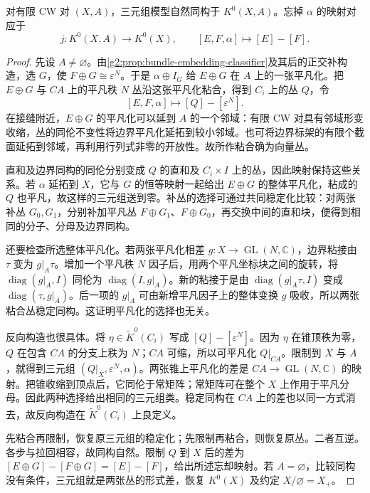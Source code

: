 \begin{proposition}\label{g2:prop:k-triple-model}
	对有限 CW 对 \((X,A)\)，三元组模型自然同构于 \(K^0(X,A)\)。忘掉 \(\alpha\) 的映射对应于
	\[
		j:K^0(X,A)\longrightarrow K^0(X),\qquad
		[E,F,\alpha]\longmapsto[E]-[F].
	\]
\end{proposition}
\begin{proof}
	先设 \(A\ne\varnothing\)。由\cref{g2:prop:bundle-embedding-classifier}及其后的正交补构造，选 \(G\)，使 \(F\oplus G\cong\varepsilon^N\)。于是 \(\alpha\oplus I_G\) 给 \(E\oplus G\) 在 \(A\) 上的一张平凡化。把 \(E\oplus G\) 与 \(CA\) 上的平凡秩 \(N\) 丛沿这张平凡化粘合，得到 \(C_i\) 上的丛 \(Q\)，令
	\[
		[E,F,\alpha]\longmapsto[Q]-[\varepsilon^N].
	\]
	在接缝附近，\(E\oplus G\) 的平凡化可以延到 \(A\) 的一个邻域：有限 CW 对具有邻域形变收缩，丛的同伦不变性将边界平凡化延拓到较小邻域。也可将边界标架的有限个截面延拓到邻域，再利用行列式非零的开放性。故所作粘合确为向量丛。

	直和及边界同构的同伦分别变成 \(Q\) 的直和及 \(C_i\times I\) 上的丛，因此映射保持这些关系。若 \(\alpha\) 延拓到 \(X\)，它与 \(G\) 的恒等映射一起给出 \(E\oplus G\) 的整体平凡化，粘成的 \(Q\) 也平凡，故这样的三元组送到零。补丛的选择可通过共同稳定化比较：对两张补丛 \(G_0,G_1\)，分别补加平凡丛 \(F\oplus G_1\)、\(F\oplus G_0\)，再交换中间的直和块，便得到相同的分子、分母及边界同构。

	还要检查所选整体平凡化。若两张平凡化相差 \(g:X\to\operatorname{GL}(N,\mathbb C)\)，边界粘接由 \(\tau\) 变为 \(g|_A\tau\)。增加一个平凡秩 \(N\) 因子后，用两个平凡坐标块之间的旋转，将 \(\operatorname{diag}(g|_A,I)\) 同伦为 \(\operatorname{diag}(I,g|_A)\)。新的粘接于是由 \(\operatorname{diag}(g|_A\tau,I)\) 变成 \(\operatorname{diag}(\tau,g|_A)\)。后一项的 \(g|_A\) 可由新增平凡因子上的整体变换 \(g\) 吸收，所以两张粘合丛稳定同构。这证明平凡化的选择也无关。

	反向构造也很具体。将 \(\eta\in\widetilde K^0(C_i)\) 写成 \([Q]-[\varepsilon^N]\)。因为 \(\eta\) 在锥顶秩为零，\(Q\) 在包含 \(CA\) 的分支上秩为 \(N\)；\(CA\) 可缩，所以可平凡化 \(Q|_{CA}\)。限制到 \(X\) 与 \(A\)，就得到三元组 \((Q|_X,\varepsilon^N,\alpha)\)。两张锥上平凡化的差是 \(CA\to\operatorname{GL}(N,\mathbb C)\) 的映射。把锥收缩到顶点后，它同伦于常矩阵；常矩阵可在整个 \(X\) 上作用于平凡分母。因此两种选择给出相同的三元组类。稳定同构在 \(CA\) 上的差也以同一方式消去，故反向构造在 \(\widetilde K^0(C_i)\) 上良定义。

	先粘合再限制，恢复原三元组的稳定化；先限制再粘合，则恢复原丛。二者互逆。各步与拉回相容，故同构自然。限制 \(Q\) 到 \(X\) 后的差为 \([E\oplus G]-[F\oplus G]=[E]-[F]\)，给出所述忘却映射。若 \(A=\varnothing\)，比较同构没有条件，三元组就是两张丛的形式差，恢复 \(K^0(X)\) 及约定 \(X/\varnothing=X_+\)。
\end{proof}


